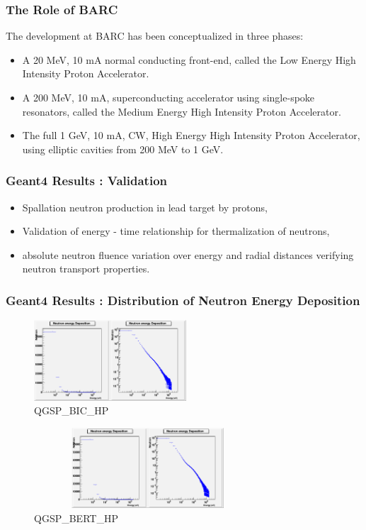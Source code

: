 \documentclass{beamer}
\begin{document}
    \begin{frame}
    \frametitle{The Role of BARC}
    The development at BARC has been conceptualized in three phases:
    \begin{itemize}
        \item A 20 MeV, 10 mA normal conducting front-end, called
        the Low Energy High Intensity Proton Accelerator.  
        \item A 200 MeV, 10 mA, superconducting accelerator using
        single-spoke resonators, called the Medium Energy High Intensity
        Proton Accelerator. 
        \item The full 1 GeV, 10 mA, CW, High Energy High Intensity
        Proton Accelerator, using elliptic cavities from 200 MeV to 1 GeV. 
    \end{itemize}
    \end{frame}

    \begin{frame}
    \frametitle{Geant4 Results : Validation}
    \begin{itemize}
        \item Spallation neutron production in lead target by protons,
        \item Validation of energy - time relationship for thermalization of neutrons,
        \item absolute neutron fluence variation over energy and radial distances verifying neutron transport properties.
    \end{itemize}
    \end{frame}

    \begin{frame}
    \frametitle{Geant4 Results : Distribution of Neutron Energy Deposition}
    \vskip -2mm
    \begin{figure}
    \includegraphics [height=30mm, width=85 mm] {PICS/NeutEdepBIC.png}
    \caption{\small QGSP\_BIC\_HP}
    \end{figure}
    \vskip -7mm
    \begin{figure}
    \includegraphics [height=30mm, width=85mm] {PICS/NeutEdepBERT.png}
    \caption{\small QGSP\_BERT\_HP}
    \end{figure}
    \end{frame}
\end{document}

